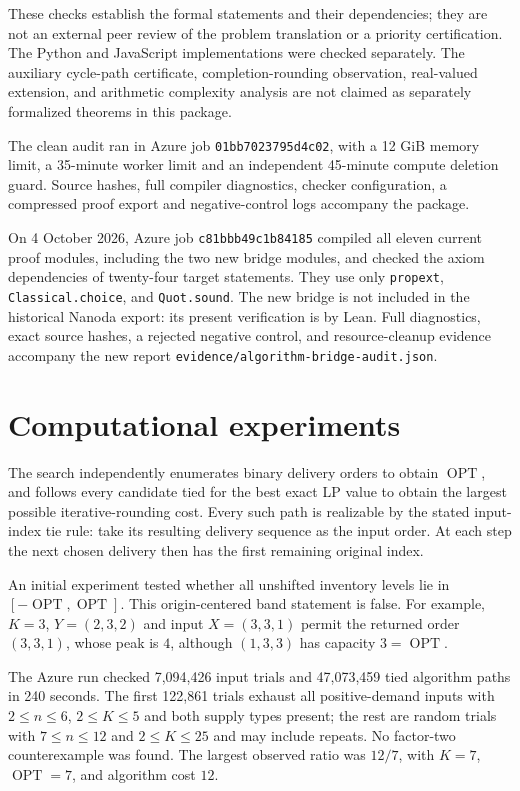 \documentclass[11pt]{article}
\newcommand{\OPT}{\operatorname{OPT}}
\begin{document}
These checks establish the formal statements and their dependencies; they
are not an external peer review of the problem translation or a priority
certification. The Python and JavaScript implementations were checked
separately. The auxiliary
cycle-path certificate, completion-rounding observation, real-valued extension,
and arithmetic complexity analysis are not claimed as separately formalized
theorems in this package.

The clean audit ran in Azure job \texttt{01bb7023795d4c02}, with a 12 GiB
memory limit, a 35-minute worker limit and an independent 45-minute compute
deletion guard. Source hashes, full compiler diagnostics, checker configuration,
a compressed proof export and negative-control logs accompany the package.

On 4 October 2026, Azure job \texttt{c81bbb49c1b84185} compiled all eleven
current proof modules, including the two new bridge modules, and checked the
axiom dependencies of twenty-four target statements. They use only
\texttt{propext}, \texttt{Classical.choice}, and \texttt{Quot.sound}.
The new bridge is not included in the historical Nanoda export: its present
verification is by Lean. Full diagnostics, exact source hashes, a rejected
negative control, and resource-cleanup evidence accompany the new report
\texttt{evidence/algorithm-bridge-audit.json}.

\section{Computational experiments}\label{app:experiments}
The search independently enumerates binary delivery orders to obtain $\OPT$,
and follows every candidate tied for the best exact LP value to obtain the
largest possible iterative-rounding cost. Every such path is realizable by
the stated input-index tie rule: take its resulting delivery sequence as
the input order. At each step the next chosen delivery then has the first
remaining original index.

An initial experiment tested whether all unshifted inventory levels lie in
$[-\OPT,\OPT]$. This origin-centered band statement is false. For example,
$K=3$, $Y=(2,3,2)$ and input $X=(3,3,1)$ permit the returned order $(3,3,1)$,
whose peak is $4$, although $(1,3,3)$ has capacity $3=\OPT$.

The Azure run checked 7,094,426 input trials and 47,073,459 tied algorithm
paths in 240 seconds. The first 122,861 trials exhaust all positive-demand
inputs with $2\le n\le6$, $2\le K\le5$ and both supply types present;
the rest are random trials with $7\le n\le12$ and $2\le K\le25$ and may
include repeats. No factor-two counterexample was found. The largest observed
ratio was $12/7$, with $K=7$, $\OPT=7$, and algorithm cost $12$.
\end{document}
